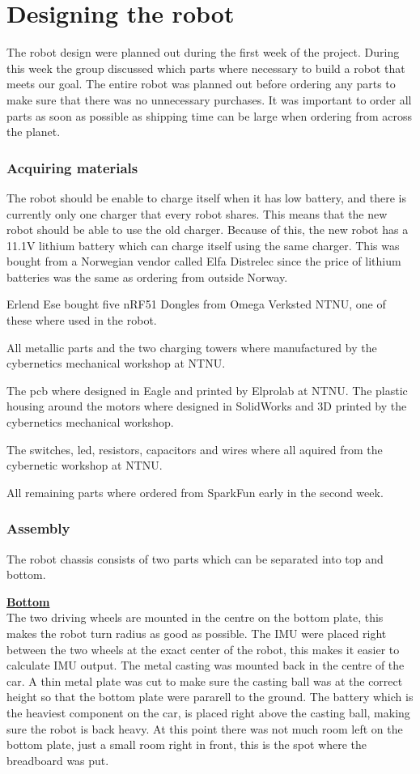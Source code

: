 \section{Designing the robot}
The robot design were planned out during the first week of the project. During this week the group discussed which parts where necessary to build a robot that meets our goal. The entire robot was planned out before ordering any parts to make sure that there was no unnecessary purchases. It was important to order all parts as soon as possible as shipping time can be large when ordering from across the planet.

\subsubsection{Acquiring materials}
The robot should be enable to charge itself when it has low battery, and there is currently only one charger that every robot shares. This means that the new robot should be able to use the old charger. Because of this, the new robot has a 11.1V lithium battery which can charge itself using the same charger. This was bought from a Norwegian vendor called Elfa Distrelec\cite{elfa} since the price of lithium batteries was the same as ordering from outside Norway.

Erlend Ese bought five nRF51 Dongles from Omega Verksted NTNU, one of these where used in the robot.

All metallic parts and the two charging towers where manufactured by the cybernetics mechanical workshop at NTNU.

The \acrshort{pcb} where designed in Eagle and printed by Elprolab\cite{elprolab} at NTNU. The plastic housing around the motors where designed in SolidWorks and 3D printed by the cybernetics mechanical workshop.

The switches, \acrfull{led}, resistors, capacitors and wires where all aquired from the cybernetic workshop at NTNU.

All remaining parts where ordered from SparkFun early in the second week.


\subsubsection{Assembly}
The robot chassis consists of two parts which can be separated into top and bottom.

\textbf{\underline{Bottom}}\\
The two driving wheels are mounted in the centre on the bottom plate, this makes the robot turn radius as good as possible. The IMU were placed right between the two wheels at the exact center of the robot, this makes it easier to calculate IMU output. The metal casting was mounted back in the centre of the car. A thin metal plate was cut to make sure the casting ball was at the correct height so that the bottom plate were pararell to the ground. The battery which is the heaviest component on the car, is placed right above the casting ball, making sure the robot is back heavy. At this point there was not much room left on the bottom plate, just a small room right in front, this is the spot where the breadboard was put.

